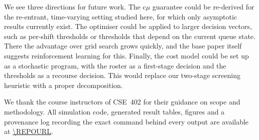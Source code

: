 \documentclass[sigconf,nonacm]{acmart}
\begin{document}
We see three directions for future work. The c$\mu$ guarantee could be
re-derived for the re-entrant, time-varying setting studied here, for which
only asymptotic results currently exist. The optimiser could be applied to
larger decision vectors, such as per-shift thresholds or thresholds that depend
on the current queue state. There the advantage over grid search grows
quickly, and the base paper itself suggests reinforcement learning for this.
Finally, the cost model could be set up as a stochastic program, with the
roster as a first-stage decision and the thresholds as a recourse decision.
This would replace our two-stage screening heuristic with a proper
decomposition.

\begin{acks}
We thank the course instructors of CSE~402 for their guidance on scope and
methodology. All simulation code, generated result tables, figures and a
provenance log recording the exact command behind every output are available
at \url{\REPOURL}.
\end{acks}



\end{document}
